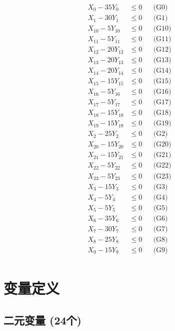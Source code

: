 \documentclass[a4paper,10pt]{article}
\begin{document}
\allowdisplaybreaks
{\small\begin{align}
X_{0} - 35Y_{0} &\leq 0 && \text{(G0)} \\
X_{1} - 30Y_{1} &\leq 0 && \text{(G1)} \\
X_{10} - 5Y_{10} &\leq 0 && \text{(G10)} \\
X_{11} - 5Y_{11} &\leq 0 && \text{(G11)} \\
X_{12} - 20Y_{12} &\leq 0 && \text{(G12)} \\
X_{13} - 20Y_{13} &\leq 0 && \text{(G13)} \\
X_{14} - 20Y_{14} &\leq 0 && \text{(G14)} \\
X_{15} - 15Y_{15} &\leq 0 && \text{(G15)} \\
X_{16} - 5Y_{16} &\leq 0 && \text{(G16)} \\
X_{17} - 5Y_{17} &\leq 0 && \text{(G17)} \\
X_{18} - 15Y_{18} &\leq 0 && \text{(G18)} \\
X_{19} - 15Y_{19} &\leq 0 && \text{(G19)} \\
X_{2} - 25Y_{2} &\leq 0 && \text{(G2)} \\
X_{20} - 15Y_{20} &\leq 0 && \text{(G20)} \\
X_{21} - 15Y_{21} &\leq 0 && \text{(G21)} \\
X_{22} - 5Y_{22} &\leq 0 && \text{(G22)} \\
X_{23} - 5Y_{23} &\leq 0 && \text{(G23)} \\
X_{3} - 15Y_{3} &\leq 0 && \text{(G3)} \\
X_{4} - 5Y_{4} &\leq 0 && \text{(G4)} \\
X_{5} - 5Y_{5} &\leq 0 && \text{(G5)} \\
\allowbreak
X_{6} - 35Y_{6} &\leq 0 && \text{(G6)} \\
X_{7} - 30Y_{7} &\leq 0 && \text{(G7)} \\
X_{8} - 25Y_{8} &\leq 0 && \text{(G8)} \\
X_{9} - 15Y_{9} &\leq 0 && \text{(G9)} \\
\end{align}}

\section{变量定义}

\subsection{二元变量 (24个)}
\end{document}
